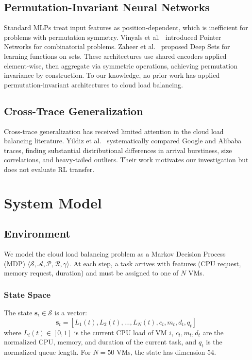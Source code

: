 \documentclass[conference]{IEEEtran}
\begin{document}
\subsection{Permutation-Invariant Neural Networks}

Standard MLPs treat input features as position-dependent, which is inefficient for problems with permutation symmetry. Vinyals et al.~\cite{vinyals2015} introduced Pointer Networks for combinatorial problems. Zaheer et al.~\cite{zaheer2017} proposed Deep Sets for learning functions on sets. These architectures use shared encoders applied element-wise, then aggregate via symmetric operations, achieving permutation invariance by construction. To our knowledge, no prior work has applied permutation-invariant architectures to cloud load balancing.

\subsection{Cross-Trace Generalization}

Cross-trace generalization has received limited attention in the cloud load balancing literature. Yildiz et al.~\cite{yildiz2026} systematically compared Google and Alibaba traces, finding substantial distributional differences in arrival burstiness, size correlations, and heavy-tailed outliers. Their work motivates our investigation but does not evaluate RL transfer.

\section{System Model}

\subsection{Environment}

We model the cloud load balancing problem as a Markov Decision Process (MDP) $\langle \mathcal{S}, \mathcal{A}, \mathcal{P}, \mathcal{R}, \gamma \rangle$. At each step, a task arrives with features (CPU request, memory request, duration) and must be assigned to one of $N$ VMs.

\subsubsection{State Space}
The state $\mathbf{s}_t \in \mathcal{S}$ is a vector:
\begin{equation}
\mathbf{s}_t = [L_1(t), L_2(t), \ldots, L_N(t), c_t, m_t, d_t, q_t]
\end{equation}
where $L_i(t) \in [0,1]$ is the current CPU load of VM $i$, $c_t, m_t, d_t$ are the normalized CPU, memory, and duration of the current task, and $q_t$ is the normalized queue length. For $N=50$ VMs, the state has dimension 54.
\end{document}
